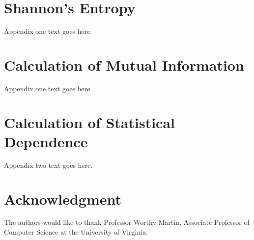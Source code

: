 \documentclass[journal]{./sty/IEEEtran}
\begin{document}
%


\appendices
\section{Shannon's Entropy}
Appendix one text goes here.

\section{Calculation of Mutual Information}
Appendix one text goes here.

\section{Calculation of Statistical Dependence}
Appendix two text goes here.


\section*{Acknowledgment}


The authors would like to thank Professor Worthy Martin, Associate Professor of Computer Science at the University of Virginia.


\ifCLASSOPTIONcaptionsoff
  \newpage
\fi



\end{document}

